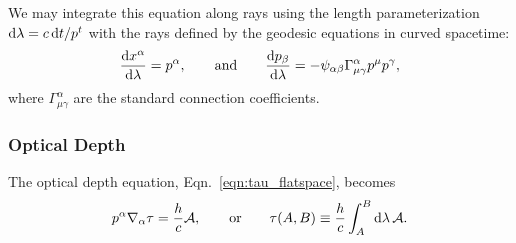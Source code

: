 We may integrate this equation along rays using the length parameterization
$\mathrm{d}\lambda=c\,\mathrm{d} t/p^t$ with the rays defined by the geodesic equations in
curved spacetime:
\begin{equation}
  \label{eqn:geo_curved_ray}
  \frac{\mathrm{d} x^\alpha}{\mathrm{d} \lambda}=p^\alpha, \qquad {\rm and} \qquad
  \frac{\mathrm{d} p_\beta}{\mathrm{d} \lambda} =-\psi_{\alpha\beta}\Gamma^\alpha_{\mu\gamma} p^\mu p^\gamma,
\end{equation}
where $\Gamma^\alpha_{\mu\gamma}$ are the standard connection coefficients.

\subsubsection{Optical Depth}
The optical depth equation, Eqn.~\ref{eqn:tau_flatspace}, becomes
\begin{equation}
  \label{eqn:tau_covariant}
  p^\alpha\nabla_\alpha \tau = \frac{h}{c} \mathcal{A}, \qquad {\rm or} \qquad
  \tau(A,B) \equiv \frac{h}{c} \int_A^B \mathrm{d} \lambda\, \mathcal{A}.
\end{equation}
